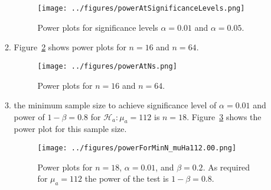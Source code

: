 \documentclass[12pt]{article}
\begin{document}
\begin{enumerate}
\begin{enumerate}
                \begin{figure}
                    \begin{center}
                        \texttt{[image: ../figures/powerAtSignificanceLevels.png]}
                    \end{center}
                    \caption{Power plots for significance levels $\alpha=0.01$ and
                    $\alpha=0.05$.}
                    \label{fig:powerAtSignificanceLevels}
                \end{figure}

            \item Figure~\ref{fig:powerAtNs} shows power plots for
                $n=16$ and $n=64$.

                \begin{figure}
                    \begin{center}
                        \texttt{[image: ../figures/powerAtNs.png]}
                    \end{center}
                    \caption{Power plots for $n=16$ and $n=64$.}
                    \label{fig:powerAtNs}
                \end{figure}

            \item the minimum sample size to achieve significance level of
                $\alpha=0.01$ and power of $1-\beta=0.8$ for $\mathcal{H}_a:
                \mu_a=112$ is $n=18$. Figure~\ref{fig:powerPlotForMinN} shows the
                power plot for this sample size.

                \begin{figure}
                    \begin{center}
                        \texttt{[image: ../figures/powerForMinN\_muHa112.00.png]}
                    \end{center}
                    \caption{Power plots for $n=18$, $\alpha=0.01$, and
                    $\beta=0.2$. As required for $\mu_a=112$ the power of the
                    test is $1-\beta=0.8$.}
                    \label{fig:powerPlotForMinN}
                \end{figure}


        \end{enumerate}
\end{enumerate}
\end{document}
